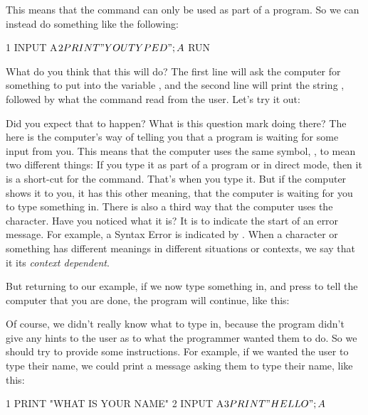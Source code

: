 
\needspace{4cm}
This means that the  command can only be used as part of a
program.  So we can instead do something like the following:

\begin{screencode}
1 INPUT A$
2 PRINT "YOU TYPED "; A$
RUN
\end{screencode}

\needspace{4cm}
What do you think that this will do?  The first line will ask the
computer for something to put into the variable , and the
second line will print the string , followed by
what the  command read from the user.  Let's try it out:


Did you expect that to happen? What is this question mark doing there?
The  here is the computer's way of telling you that a
program is waiting for some input from you.  This means that the
computer uses the same symbol, , to mean two different things:
If you type it as part of a program or in direct mode, then it is a
short-cut for the  command. That's when you type it. But if
the computer shows it to you, it has this other meaning, that the
computer is waiting for you to type something in. There is also a
third way that the computer uses the  character. Have you
noticed what it is?  It is to indicate the start of an error
message. For example, a Syntax Error is indicated by . When a character or something has different meanings in
different situations or contexts, we say that it its {\em context
  dependent}.

\needspace{4cm}
But returning to our example,  if we now type
something in, and press  to tell the
computer that you are done, the program will continue, like this:


\needspace{4cm}
Of course, we didn't really know what to type in, because the program
didn't give any hints to the user as to what the programmer wanted
them to do. So we should try to provide some instructions.  For
example, if we wanted the user to type their name, we could print a
message asking them to type their name, like this:

\begin{screencode}
  1 PRINT "WHAT IS YOUR NAME"
  2 INPUT A$
  3 PRINT "HELLO "; A$
\end{screencode}

